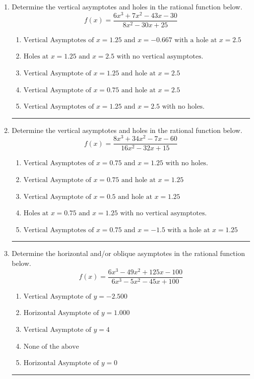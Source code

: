 \documentclass[14pt]{extbook}
\newcommand{\litem}[1]{\item#1\hspace*{-1cm}\rule{\textwidth}{0.4pt}}
\begin{document}
\begin{enumerate}
\litem{
Determine the vertical asymptotes and holes in the rational function below.\[ f(x) = \frac{6x^{3} +7 x^{2} -43 x -30}{8x^{2} -30 x + 25} \]\begin{enumerate}[label=\Alph*.]
\item \( \text{Vertical Asymptotes of } x = 1.25 \text{ and } x = -0.667 \text{ with a hole at } x = 2.5 \)
\item \( \text{Holes at } x = 1.25 \text{ and } x = 2.5 \text{ with no vertical asymptotes.} \)
\item \( \text{Vertical Asymptote of } x = 1.25 \text{ and hole at } x = 2.5 \)
\item \( \text{Vertical Asymptote of } x = 0.75 \text{ and hole at } x = 2.5 \)
\item \( \text{Vertical Asymptotes of } x = 1.25 \text{ and } x = 2.5 \text{ with no holes.} \)

\end{enumerate} }
\litem{
Determine the vertical asymptotes and holes in the rational function below.\[ f(x) = \frac{8x^{3} +34 x^{2} -7 x -60}{16x^{2} -32 x + 15} \]\begin{enumerate}[label=\Alph*.]
\item \( \text{Vertical Asymptotes of } x = 0.75 \text{ and } x = 1.25 \text{ with no holes.} \)
\item \( \text{Vertical Asymptote of } x = 0.75 \text{ and hole at } x = 1.25 \)
\item \( \text{Vertical Asymptote of } x = 0.5 \text{ and hole at } x = 1.25 \)
\item \( \text{Holes at } x = 0.75 \text{ and } x = 1.25 \text{ with no vertical asymptotes.} \)
\item \( \text{Vertical Asymptotes of } x = 0.75 \text{ and } x = -1.5 \text{ with a hole at } x = 1.25 \)

\end{enumerate} }
\litem{
Determine the horizontal and/or oblique asymptotes in the rational function below.\[ f(x) = \frac{6x^{3} -49 x^{2} +125 x -100}{6x^{3} -5 x^{2} -45 x + 100} \]\begin{enumerate}[label=\Alph*.]
\item \( \text{Vertical Asymptote of } y = -2.500  \)
\item \( \text{Horizontal Asymptote of } y = 1.000  \)
\item \( \text{Vertical Asymptote of } y = 4  \)
\item \( \text{None of the above} \)
\item \( \text{Horizontal Asymptote of } y = 0  \)


\end{enumerate}}
\end{enumerate}
\end{document}
